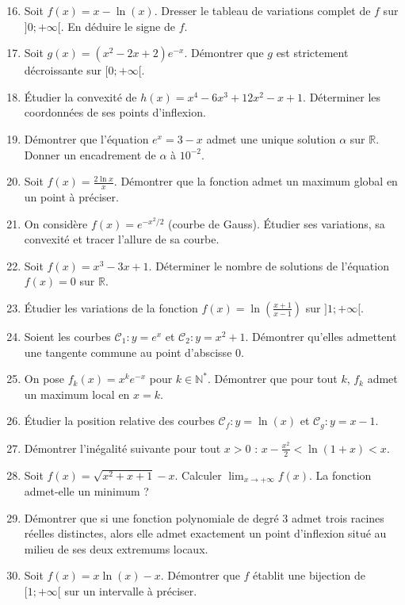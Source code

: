 \documentclass[10pt, a4paper]{article}
\begin{document}
\begin{enumerate}
    \setcounter{enumi}{15}
    \item Soit $f(x) = x - \ln(x)$. Dresser le tableau de variations complet de $f$ sur $]0 ; +\infty[$. En déduire le signe de $f$.
    \item Soit $g(x) = (x^2 - 2x + 2)e^{-x}$. Démontrer que $g$ est strictement décroissante sur $[0 ; +\infty[$.
    \item Étudier la convexité de $h(x) = x^4 - 6x^3 + 12x^2 - x + 1$. Déterminer les coordonnées de ses points d'inflexion.
    \item Démontrer que l'équation $e^x = 3 - x$ admet une unique solution $\alpha$ sur $\mathbb{R}$. Donner un encadrement de $\alpha$ à $10^{-2}$.
    \item Soit $f(x) = \frac{2\ln x}{x}$. Démontrer que la fonction admet un maximum global en un point à préciser.
    \item On considère $f(x) = e^{-x^2/2}$ (courbe de Gauss). Étudier ses variations, sa convexité et tracer l'allure de sa courbe.
    \item Soit $f(x) = x^3 - 3x + 1$. Déterminer le nombre de solutions de l'équation $f(x) = 0$ sur $\mathbb{R}$.
    \item Étudier les variations de la fonction $f(x) = \ln\left(\frac{x+1}{x-1}\right)$ sur $]1 ; +\infty[$.
    \item Soient les courbes $\mathcal{C}_1 : y = e^x$ et $\mathcal{C}_2 : y = x^2+1$. Démontrer qu'elles admettent une tangente commune au point d'abscisse $0$.
    \item On pose $f_k(x) = x^k e^{-x}$ pour $k \in \mathbb{N}^*$. Démontrer que pour tout $k$, $f_k$ admet un maximum local en $x=k$.
    \item Étudier la position relative des courbes $\mathcal{C}_f : y = \ln(x)$ et $\mathcal{C}_g : y = x - 1$.
    \item Démontrer l'inégalité suivante pour tout $x > 0$ : $\displaystyle x - \frac{x^2}{2} < \ln(1+x) < x$.
    \item Soit $f(x) = \sqrt{x^2 + x + 1} - x$. Calculer $\lim_{x \to +\infty} f(x)$. La fonction admet-elle un minimum ?
    \item Démontrer que si une fonction polynomiale de degré 3 admet trois racines réelles distinctes, alors elle admet exactement un point d'inflexion situé au milieu de ses deux extremums locaux.
    \item Soit $f(x) = x \ln(x) - x$. Démontrer que $f$ établit une bijection de $[1 ; +\infty[$ sur un intervalle à préciser.
\end{enumerate}
\end{document}
